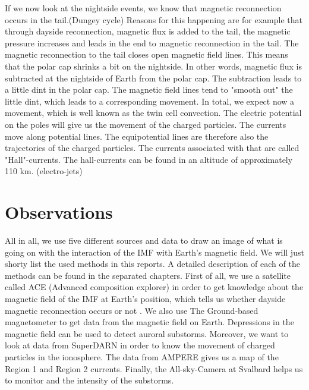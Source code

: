 \documentclass[10pt,a4paper]{article}
\begin{document}
If we now look at the nightside events, we know that magnetic reconnection occurs in the tail.(Dungey cycle) Reasons for this happening 
are for example that through dayside reconnection, magnetic flux is added to the tail, the magnetic pressure increases and leads in the end to magnetic reconnection in the tail. The magnetic reconnection to the tail closes open magnetic field lines. This means that the polar cap shrinks a bit on the nightside. 
In other words, magnetic flux is subtracted at the nightside of Earth from the polar cap. The subtraction leads to a little dint in the polar cap. 
The magnetic field lines tend to "smooth out" the little dint, which leads to a corresponding movement. 
In total, we expect now a movement, which is well known as the twin cell convection. The electric potential on the poles will give us the movement of the 
charged particles. The currents move along potential lines. The equipotential lines are therefore also the trajectories of the charged particles. 
The currents associated with that are called "Hall"-currents. The hall-currents can be found in an altitude of approximately 110 km. (electro-jets)


\section{Observations}

All in all, we use five different sources and data to draw an image of what is going on with the interaction of the IMF with Earth's magnetic field. We will just shorty list the used methods in this reports. A detailed description of each of the methods can be found in the separated chapters. 
First of all, we use a satellite called ACE (Advanced composition explorer) in order to get knowledge about the magnetic field of the IMF at Earth's position, which tells us whether dayside magnetic reconnection occurs or not . 
We also use The Ground-based magnetometer to get data from the magnetic field on Earth. Depressions in the magnetic field can be used to detect auroral substorms. 
Moreover, we want to look at data from SuperDARN in order to know the movement of charged particles in the ionosphere.
The data from AMPERE gives us a map of the Region 1 and Region 2 currents. Finally, the All-sky-Camera at Svalbard helps us to monitor and the intensity of the substorms.  
\end{document}
